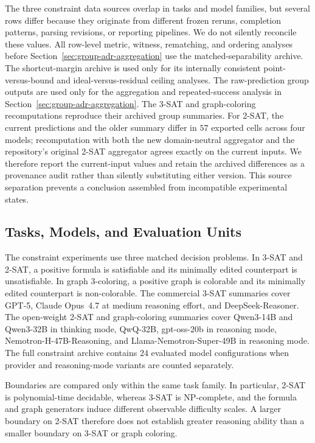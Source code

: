 \documentclass[acmsmall,screen,review,anonymous]{acmart}
\newcounter{experiment}
\begin{document}
The three constraint data sources overlap in tasks and model families, but several
rows differ because they originate from different frozen reruns, completion
patterns, parsing revisions, or reporting pipelines. We do not silently
reconcile these values. All row-level metric, witness, rematching, and ordering
analyses before Section~\ref{sec:group-adr-aggregation} use the
matched-separability archive. The shortcut-margin archive is used only for its
internally consistent point-versus-bound and ideal-versus-residual ceiling
analyses. The raw-prediction group outputs are used only for the aggregation
and repeated-success analysis in
Section~\ref{sec:group-adr-aggregation}. The 3-SAT and graph-coloring
recomputations reproduce their archived group summaries. For 2-SAT, the
current predictions and the older summary differ in \(57\) exported cells
across four models; recomputation with both the new domain-neutral aggregator
and the repository's original 2-SAT aggregator agrees exactly on the current
inputs. We therefore report the current-input values and retain the archived
differences as a provenance audit rather than silently substituting either
version. This source separation prevents a conclusion assembled from
incompatible experimental states.

\subsection{Tasks, Models, and Evaluation Units}
\label{sec:experimental-tasks}

The constraint experiments use three matched decision problems. In 3-SAT and
2-SAT, a positive formula is satisfiable and its minimally edited counterpart
is unsatisfiable. In graph 3-coloring, a positive graph is colorable and its
minimally edited counterpart is non-colorable. The commercial 3-SAT summaries
cover GPT-5, Claude Opus~4.7 at medium reasoning effort, and
DeepSeek-Reasoner. The open-weight 2-SAT and graph-coloring summaries cover
Qwen3-14B and Qwen3-32B in thinking mode, QwQ-32B, gpt-oss-20b in reasoning
mode, Nemotron-H-47B-Reasoning, and Llama-Nemotron-Super-49B in reasoning
mode. The full constraint archive contains \(24\) evaluated model
configurations when provider and reasoning-mode variants are counted
separately.

Boundaries are compared only within the same task family. In particular,
2-SAT is polynomial-time decidable, whereas 3-SAT is NP-complete, and the
formula and graph generators induce different observable difficulty scales.
A larger boundary on 2-SAT therefore does not establish greater reasoning
ability than a smaller boundary on 3-SAT or graph coloring.
\end{document}
